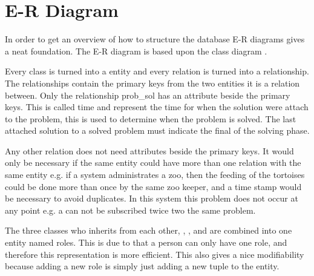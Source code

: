\newcommand{\erdiagram}[1][]{E-R diagram}
\section{E-R Diagram}
In order to get an overview of how to structure the database \erdiagram[]s gives a neat foundation. 
The \erdiagram[] is based upon the class diagram . 

Every class is turned into a entity and every relation is turned into a relationship. The relationships contain the primary keys from the two entities it is a relation between. Only the relationship prob\_sol has an attribute beside the primary keys. This is called time and represent the time for when the solution were attach to the problem, this is used to determine when the problem is solved. The last attached solution to a solved problem must indicate the final of the solving phase. 

Any other relation does not need attributes beside the primary keys. It would only be necessary if the same entity could have more than one relation with the same entity e.g. if a system administrates a zoo, then the feeding of the tortoises could be done more than once by the same zoo keeper, and a time stamp would be necessary to avoid duplicates. In this system this problem does not occur at any point e.g. a \client[] can not be subscribed twice two the same problem. 

The three classes who inherits from each other, \client[], \staff[], and \admin[] are combined into one entity named roles. This is due to that a person can only have one role, and therefore this representation is more efficient. This also gives a nice modifiability because adding a new role is simply just adding a new tuple to the entity. 